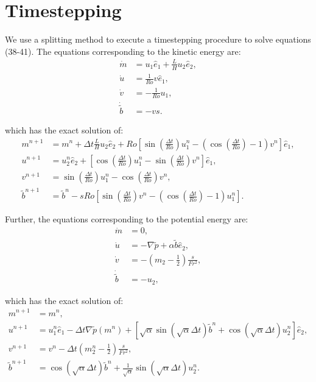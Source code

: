 \documentclass[11pt, oneside]{article}   	%
\newcommand{\eone}{\hat{e}_1}
\newcommand{\etwo}{\hat{e}_2}
\newcommand{\bt}{\tilde{b}}
\newcommand{\pt}{\tilde{p}}
\newcommand{\dt}{\Delta t}
\begin{document}
\section{Timestepping}

We use a splitting method to execute a timestepping procedure to solve equations (38-41). The equations corresponding to the kinetic energy are:
\begin{align} 
\dot{m} &= u_1 \eone +  \frac{L}{H} u_2 \etwo, \\
\dot{u} &= \frac{1}{Ro} v \eone, \\
\dot{v} &= -\frac{1}{Ro} u_1, \\
\dot{\bt} &= -v s.
\end{align}

which has the exact solution of:
\begin{align} 
m^{n+1} &= m^n + \dt \frac{L}{H} u_2 \etwo + Ro [\sin(\frac{\dt}{Ro}) u_1^n - (\cos(\frac{\dt}{Ro}) - 1) v^n] \eone, \\
u^{n+1} &= u_2^n \etwo + [\cos(\frac{\dt}{Ro}) u_1^n - \sin(\frac{\dt}{Ro}) v^n] \eone, \\
v^{n+1} &= \sin(\frac{\dt}{Ro}) u_1^n - \cos(\frac{\dt}{Ro}) v^n, \\
\bt^{n+1} &= \bt^n - sRo[\sin(\frac{\dt}{Ro}) v^n - (\cos(\frac{\dt}{Ro}) - 1) u_1^n].
\end{align}

Further, the equations corresponding to the potential energy are:
\begin{align} 
\dot{m} &= 0, \\
\dot{u} &= - \nabla \pt + \alpha \bt \etwo, \\
\dot{v} &= - (m_2 - \frac{1}{2}) \frac{s}{Fr^2}, \\
\dot{\bt} &= -u_2,
\end{align}

which has the exact solution of:
\begin{align} 
m^{n+1} &= m^n, \\
u^{n+1} &=  u_1^n \eone - \dt \nabla \pt(m^n) + [\sqrt{\alpha} \sin(\sqrt{\alpha} \dt)  \bt^n + \cos(\sqrt{\alpha} \dt) u_2^n] \etwo, \\
v^{n+1} &= v^n - \dt (m_2^n - \frac{1}{2})\frac{s}{Fr^2}, \\
\bt^{n+1} &= \cos(\sqrt{\alpha} \dt)  \bt^n + \frac{1}{\sqrt{\alpha}} \sin(\sqrt{\alpha} \dt) u_2^n.
\end{align}
\end{document}
